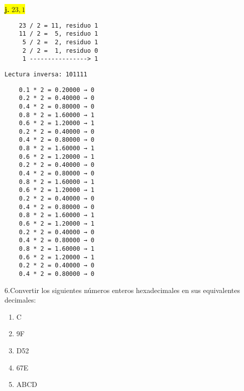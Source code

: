\documentclass[a4paper,12pt]{article}
\begin{document}
\begin{center}
	\colorbox{yellow}{{\textbf{j.} $23,1$}} \\ \vspace{0.3cm}
\end{center}	
\vspace{-1em}
\begin{minipage}[t]{0.40\textwidth}
	\hspace{2,5cm}
	
	\begin{Verbatim}
	23 / 2 = 11, residuo 1
	11 / 2 =  5, residuo 1
	 5 / 2 =  2, residuo 1
	 2 / 2 =  1, residuo 0
	 1 ----------------> 1
	\end{Verbatim}
	\hspace{1,5cm}\texttt{Lectura inversa: 101111}
\end{minipage}
\hfill
\begin{minipage}[t]{0.40\textwidth}
	\hspace{2cm}
	
	\begin{Verbatim}
	0.1 * 2 = 0.20000 → 0 
	0.2 * 2 = 0.40000 → 0 
	0.4 * 2 = 0.80000 → 0 
	0.8 * 2 = 1.60000 → 1 
	0.6 * 2 = 1.20000 → 1 
	0.2 * 2 = 0.40000 → 0 
	0.4 * 2 = 0.80000 → 0 
	0.8 * 2 = 1.60000 → 1 
	0.6 * 2 = 1.20000 → 1 
	0.2 * 2 = 0.40000 → 0 
	0.4 * 2 = 0.80000 → 0 
	0.8 * 2 = 1.60000 → 1 
	0.6 * 2 = 1.20000 → 1 
	0.2 * 2 = 0.40000 → 0 
	0.4 * 2 = 0.80000 → 0 
	0.8 * 2 = 1.60000 → 1 
	0.6 * 2 = 1.20000 → 1 
	0.2 * 2 = 0.40000 → 0 
	0.4 * 2 = 0.80000 → 0 
	0.8 * 2 = 1.60000 → 1 
	0.6 * 2 = 1.20000 → 1 
	0.2 * 2 = 0.40000 → 0 
	0.4 * 2 = 0.80000 → 0 
	\end{Verbatim}
\end{minipage}
\begin{center}
	\hspace{2cm}
\end{center}

	6.Convertir los siguientes números enteros hexadecimales en sus equivalentes
	decimales:
	\begin{enumerate}
		\item C 
		\item 9F 
		\item D52 
		\item 67E 
		\item ABCD
	\end{enumerate}
	
\end{document}
